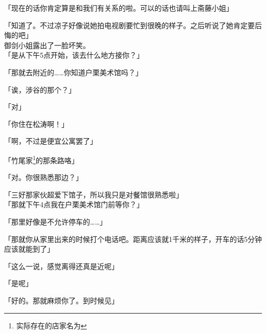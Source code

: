 「现在的话你肯定算是和我们有关系的啦。可以的话也请叫上斋藤小姐」

「知道了。不过凉子好像说她拍电视剧要忙到很晚的样子。之后听说了她肯定要后悔的吧」\\

御剑小姐露出了一脸坏笑。\\

「是从下午5点开始，该去什么地方接你？」

「那就去附近的……你知道户栗美术馆吗？」

「诶，涉谷的那个？」

「对」

「你住在松涛啊！」

「啊，不过是便宜公寓罢了」

「竹尾家\footnote{实际存在的店家名为}的那条路咯」

「对。你很熟悉那边？」

「三好那家伙超爱下馆子，所以我只是对餐馆很熟悉啦」\\

「那就下午4点我在户栗美术馆门前等你？」

「那里好像是不允许停车的……」

「那就你从家里出来的时候打个电话吧。距离应该就1千米的样子，开车的话5分钟应该就能到了」

「这么一说，感觉离得还真是近呢」

「是呢」

「好的。那就麻烦你了。到时候见」\\

